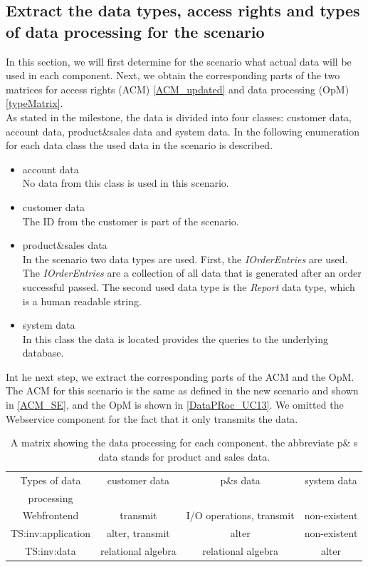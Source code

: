 \subsection{Extract the data types, access rights and types of data processing for the scenario}
In this section, we will first determine for the scenario what actual data will be used in each component. Next, we obtain the corresponding parts of the two matrices for access rights (ACM) \autoref{ACM_updated} and data processing (OpM) \autoref{typeMatrix}.\\
As stated in the milestone, the data is divided into four classes: customer data, account data, product\&sales data and system data. In the following enumeration for each data class the used data in the scenario is described.
\begin{itemize}
\item account data \\ No data from this class is used in this scenario.
\item customer data\\ The ID from the customer is part of the scenario.
\item product\&sales data\\ In the scenario two data types are used. First, the \textit{IOrderEntries} are used. The \textit{IOrderEntries} are a collection of all data that is generated after an order successful passed. The second used data type is the \textit{Report} data type, which is a human readable string. 
\item system data \\ In this class the data is located provides the queries to the underlying database.
\end{itemize}

Int he next step, we extract the corresponding parts of the ACM and the OpM. The ACM for this scenario is the same as defined in the new scenario and shown in \autoref{ACM_SE},  and the OpM is shown in \autoref{DataPRoc_UC13}. We omitted the Webservice component for the fact that it only transmits the data.\\

\begin{table}
\begin{tabular}{|c|c|c|c|}
\hline 
Types of data & customer data & p\&s data & system data \\
 processing & & & \\
\hline 
Webfrontend & transmit & I/O operations, transmit & non-existent \\ 
\hline 
TS:inv:application & alter, transmit & alter & non-existent \\ 
\hline 
TS:inv:data & relational algebra & relational algebra & alter \\ 
\hline 
\end{tabular} 
\caption{A matrix showing the data processing for each component. the abbreviate p\& s data stands for product and sales data.}
\label{DataPRoc_UC14}
\end{table}

